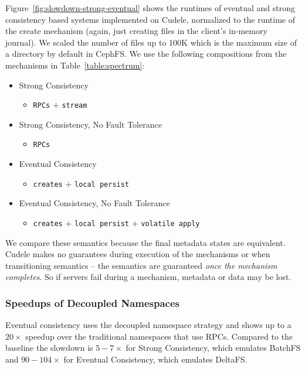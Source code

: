 Figure~\ref{fig:slowdown-strong-eventual} shows the runtimes of eventual and
strong consistency based systems implemented on Cudele, normalized to the
runtime of the create mechanism (again, just creating files in the client's
in-memory journal). We scaled the number of files up to 100K which is the
maximum size of a directory by default in CephFS. We use the following
compositions from the mechanisms in Table~\ref{table:spectrum}: 

\begin{itemize}
  \item Strong Consistency
  \begin{itemize}
    \item[]  \texttt{RPCs} \(+\) \texttt{stream}
  \end{itemize}
  \item Strong Consistency, No Fault Tolerance
  \begin{itemize}
    \item[] \texttt{RPCs}
  \end{itemize}
  \item Eventual Consistency
  \begin{itemize}
    \item[] \texttt{creates} \(+\) \texttt{local persist}
  \end{itemize}
  \item Eventual Consistency, No Fault Tolerance
  \begin{itemize}
    \item[] \texttt{creates} \(+\) \texttt{local persist} \(+\) \texttt{volatile apply}
  \end{itemize}
\end{itemize}

We compare these semantics because the final metadata states are equivalent.
Cudele makes no guarantees during execution of the mechanisms or when
transitioning semantics -- the semantics are guaranteed {\it once the mechanism
completes}. So if servers fail during a mechanism, metadata or data may be
lost.

\subsubsection{Speedups of Decoupled Namespaces} Eventual consistency uses the
decoupled namespace strategy and shows up to a \(20\times\) speedup over the
traditional namespaces that use RPCs. Compared to the baseline the slowdown is
\(5-7\times\) for Strong Consistency, which emulates BatchFS and
\(90-104\times\) for Eventual Consistency, which emulates DeltaFS.

